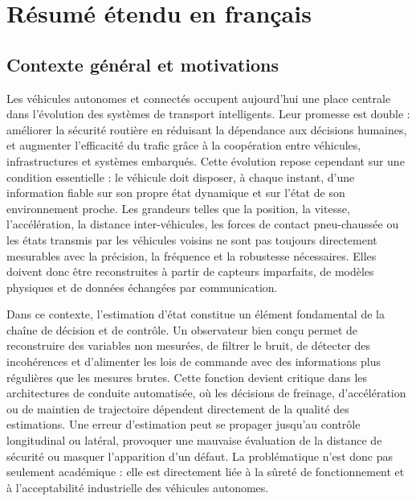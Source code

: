 \chapter*{Résumé étendu en français}\adjustmtc
{}

\section*{Contexte général et motivations}

Les véhicules autonomes et connectés occupent aujourd'hui une place centrale dans l'évolution des systèmes de transport intelligents. Leur promesse est double : améliorer la sécurité routière en réduisant la dépendance aux décisions humaines, et augmenter l'efficacité du trafic grâce à la coopération entre véhicules, infrastructures et systèmes embarqués. Cette évolution repose cependant sur une condition essentielle : le véhicule doit disposer, à chaque instant, d'une information fiable sur son propre état dynamique et sur l'état de son environnement proche. Les grandeurs telles que la position, la vitesse, l'accélération, la distance inter-véhicules, les forces de contact pneu-chaussée ou les états transmis par les véhicules voisins ne sont pas toujours directement mesurables avec la précision, la fréquence et la robustesse nécessaires. Elles doivent donc être reconstruites à partir de capteurs imparfaits, de modèles physiques et de données échangées par communication.

Dans ce contexte, l'estimation d'état constitue un élément fondamental de la chaîne de décision et de contrôle. Un observateur bien conçu permet de reconstruire des variables non mesurées, de filtrer le bruit, de détecter des incohérences et d'alimenter les lois de commande avec des informations plus régulières que les mesures brutes. Cette fonction devient critique dans les architectures de conduite automatisée, où les décisions de freinage, d'accélération ou de maintien de trajectoire dépendent directement de la qualité des estimations. Une erreur d'estimation peut se propager jusqu'au contrôle longitudinal ou latéral, provoquer une mauvaise évaluation de la distance de sécurité ou masquer l'apparition d'un défaut. La problématique n'est donc pas seulement académique : elle est directement liée à la sûreté de fonctionnement et à l'acceptabilité industrielle des véhicules autonomes.


